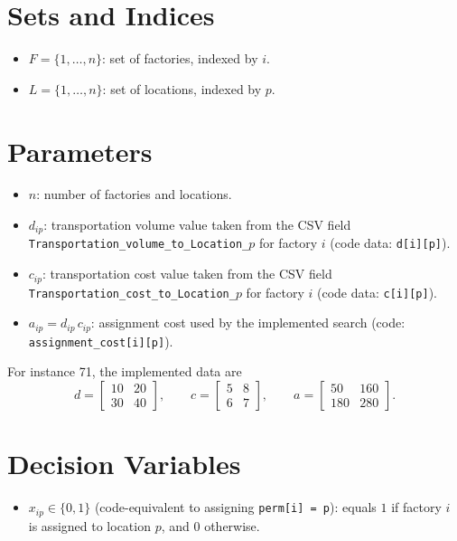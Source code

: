 \section*{Sets and Indices}

\begin{itemize}
    \item $F = \{1,\dots,n\}$: set of factories, indexed by $i$.
    \item $L = \{1,\dots,n\}$: set of locations, indexed by $p$.
\end{itemize}

\section*{Parameters}

\begin{itemize}
    \item $n$: number of factories and locations.
    \item $d_{ip}$: transportation volume value taken from the CSV field \texttt{Transportation\_volume\_to\_Location\_$p$} for factory $i$ (code data: \texttt{d[i][p]}).
    \item $c_{ip}$: transportation cost value taken from the CSV field \texttt{Transportation\_cost\_to\_Location\_$p$} for factory $i$ (code data: \texttt{c[i][p]}).
    \item $a_{ip} = d_{ip}\,c_{ip}$: assignment cost used by the implemented search (code: \texttt{assignment\_cost[i][p]}).
\end{itemize}

For instance 71, the implemented data are
\[
d = \begin{bmatrix}
10 & 20\\
30 & 40
\end{bmatrix},
\qquad
c = \begin{bmatrix}
5 & 8\\
6 & 7
\end{bmatrix},
\qquad
a = \begin{bmatrix}
50 & 160\\
180 & 280
\end{bmatrix}.
\]

\section*{Decision Variables}

\begin{itemize}
    \item $x_{ip} \in \{0,1\}$ (code-equivalent to assigning \texttt{perm[i] = p}): equals $1$ if factory $i$ is assigned to location $p$, and $0$ otherwise.
\end{itemize}

